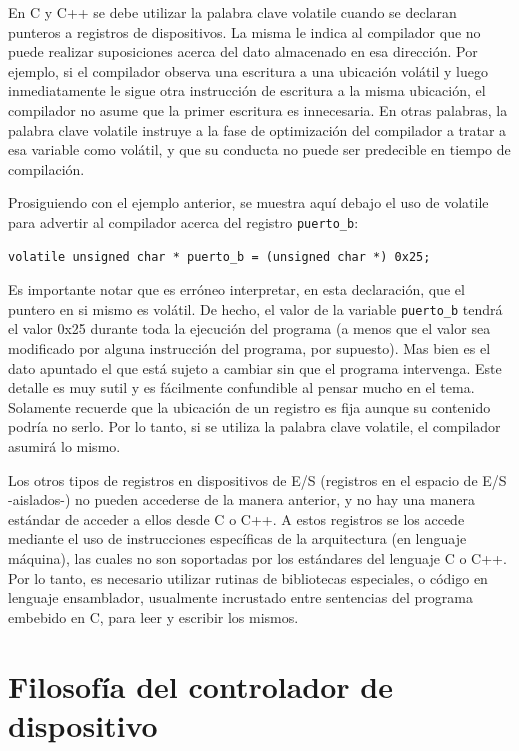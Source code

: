 \documentclass[output=paper, 
colorlinks,
citecolor=brown,
newtxmath
]{langscibook}
\begin{document}
En C y C++ se debe utilizar la palabra clave volatile cuando se 
declaran punteros a registros de dispositivos.
La misma le indica al compilador que no puede realizar suposiciones acerca
del dato almacenado en esa dirección. Por ejemplo, si el compilador
observa una escritura a una ubicación volátil y luego inmediatamente 
le sigue otra instrucción de escritura a la misma ubicación, el compilador 
no asume  que la primer escritura es innecesaria. En otras palabras, la
palabra clave volatile instruye a la fase de optimización del compilador 
a tratar a esa variable como volátil, y que su conducta no puede ser
predecible en tiempo de compilación.

Prosiguiendo con el ejemplo anterior, se muestra aquí debajo el uso 
de volatile para advertir al compilador acerca del registro \texttt{puerto\_b}:

\begin{verbatim}
volatile unsigned char * puerto_b = (unsigned char *) 0x25;
\end{verbatim}

Es importante notar que es erróneo interpretar, en esta declaración,
que el puntero en si mismo es volátil. De hecho, el valor de la
variable \texttt{puerto\_b} tendrá el valor 0x25 durante toda la ejecución del programa
(a menos que el valor sea modificado por alguna instrucción del programa, por
supuesto). Mas bien es el dato apuntado el que está sujeto a cambiar
sin que el programa intervenga. Este detalle es muy sutil y es fácilmente
confundible al pensar mucho en el tema. Solamente recuerde que la ubicación
de un registro es fija aunque su contenido podría no serlo. Por lo tanto, si se
utiliza la palabra clave volatile, el compilador asumirá lo mismo.

Los otros tipos de registros en dispositivos de E/S (registros en el espacio
de E/S -aislados-) no pueden accederse de la manera anterior, y no
hay una manera estándar de acceder a ellos desde C o C++. 
A estos registros se los accede mediante el uso de instrucciones específicas
de la arquitectura (en lenguaje máquina), las cuales no son soportadas por los 
estándares del lenguaje C o C++. Por lo tanto,
es necesario utilizar rutinas de bibliotecas especiales, o código en lenguaje
ensamblador, usualmente incrustado entre sentencias del programa embebido en C,
para leer y escribir los mismos.


\section {Filosofía del controlador de dispositivo}
\end{document}
